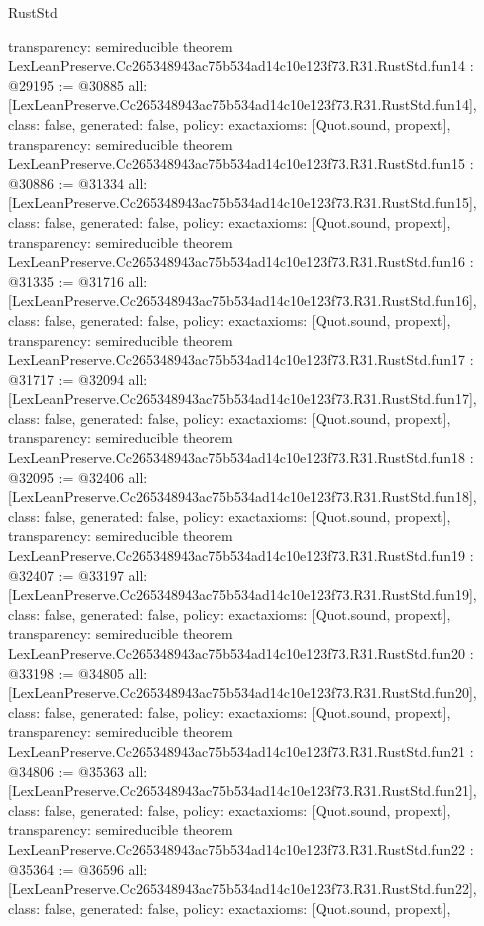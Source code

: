 \begin{lexlean}{RustStd}
\begin{coremodule}
{  transparency: semireducible
}
theorem LexLeanPreserve.Cc265348943ac75b534ad14c10e123f73.R31.RustStd.fun14 : @29195 := @30885 {
  all: [LexLeanPreserve.Cc265348943ac75b534ad14c10e123f73.R31.RustStd.fun14],
  class: false,
  generated: false,
  policy: exact{axioms: [Quot.sound, propext]},
  transparency: semireducible
}
theorem LexLeanPreserve.Cc265348943ac75b534ad14c10e123f73.R31.RustStd.fun15 : @30886 := @31334 {
  all: [LexLeanPreserve.Cc265348943ac75b534ad14c10e123f73.R31.RustStd.fun15],
  class: false,
  generated: false,
  policy: exact{axioms: [Quot.sound, propext]},
  transparency: semireducible
}
theorem LexLeanPreserve.Cc265348943ac75b534ad14c10e123f73.R31.RustStd.fun16 : @31335 := @31716 {
  all: [LexLeanPreserve.Cc265348943ac75b534ad14c10e123f73.R31.RustStd.fun16],
  class: false,
  generated: false,
  policy: exact{axioms: [Quot.sound, propext]},
  transparency: semireducible
}
theorem LexLeanPreserve.Cc265348943ac75b534ad14c10e123f73.R31.RustStd.fun17 : @31717 := @32094 {
  all: [LexLeanPreserve.Cc265348943ac75b534ad14c10e123f73.R31.RustStd.fun17],
  class: false,
  generated: false,
  policy: exact{axioms: [Quot.sound, propext]},
  transparency: semireducible
}
theorem LexLeanPreserve.Cc265348943ac75b534ad14c10e123f73.R31.RustStd.fun18 : @32095 := @32406 {
  all: [LexLeanPreserve.Cc265348943ac75b534ad14c10e123f73.R31.RustStd.fun18],
  class: false,
  generated: false,
  policy: exact{axioms: [Quot.sound, propext]},
  transparency: semireducible
}
theorem LexLeanPreserve.Cc265348943ac75b534ad14c10e123f73.R31.RustStd.fun19 : @32407 := @33197 {
  all: [LexLeanPreserve.Cc265348943ac75b534ad14c10e123f73.R31.RustStd.fun19],
  class: false,
  generated: false,
  policy: exact{axioms: [Quot.sound, propext]},
  transparency: semireducible
}
theorem LexLeanPreserve.Cc265348943ac75b534ad14c10e123f73.R31.RustStd.fun20 : @33198 := @34805 {
  all: [LexLeanPreserve.Cc265348943ac75b534ad14c10e123f73.R31.RustStd.fun20],
  class: false,
  generated: false,
  policy: exact{axioms: [Quot.sound, propext]},
  transparency: semireducible
}
theorem LexLeanPreserve.Cc265348943ac75b534ad14c10e123f73.R31.RustStd.fun21 : @34806 := @35363 {
  all: [LexLeanPreserve.Cc265348943ac75b534ad14c10e123f73.R31.RustStd.fun21],
  class: false,
  generated: false,
  policy: exact{axioms: [Quot.sound, propext]},
  transparency: semireducible
}
theorem LexLeanPreserve.Cc265348943ac75b534ad14c10e123f73.R31.RustStd.fun22 : @35364 := @36596 {
  all: [LexLeanPreserve.Cc265348943ac75b534ad14c10e123f73.R31.RustStd.fun22],
  class: false,
  generated: false,
  policy: exact{axioms: [Quot.sound, propext]},
}
\end{coremodule}
\end{lexlean}
